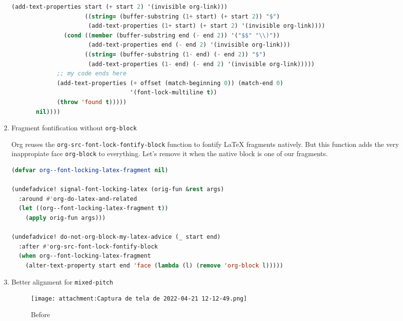 \documentclass[11pt]{article}
\begin{document}
\begin{enumerate}
\begin{enumerate}
\begin{lstlisting}[language=Lisp]
                      (add-text-properties start (+ start 2) '(invisible org-link)))
                     ((string= (buffer-substring (1+ start) (+ start 2)) "$")
                      (add-text-properties (1+ start) (+ start 2) '(invisible org-link))))
               (cond ((member (buffer-substring end (- end 2)) '("$$" "\\)"))
                      (add-text-properties end (- end 2) '(invisible org-link)))
                     ((string= (buffer-substring (1- end) (- end 2)) "$")
                      (add-text-properties (1- end) (- end 2) '(invisible org-link)))))
             ;; my code ends here
             (add-text-properties (+ offset (match-beginning 0)) (match-end 0)
                                  '(font-lock-multiline t))
             (throw 'found t)))))
       nil))))
\end{lstlisting}
  \item Fragment fontification without \texttt{org-block}
  \label{sec:fragment-fontification-without-org-block}

  Org reuses the \lstinline|org-src-font-lock-fontify-block| function to fontify LaTeX fragments natively. But this function adds the very inappropiate face \lstinline|org-block| to everything. Let’s remove it when the native block is one of our fragments.

\begin{lstlisting}[language=Lisp]
(defvar org--font-locking-latex-fragment nil)

(undefadvice! signal-font-locking-latex (orig-fun &rest args)
  :around #'org-do-latex-and-related
  (let ((org--font-locking-latex-fragment t))
    (apply orig-fun args)))

(undefadvice! do-not-org-block-my-latex-advice (_ start end)
  :after #'org-src-font-lock-fontify-block
  (when org--font-locking-latex-fragment
    (alter-text-property start end 'face (lambda (l) (remove 'org-block l)))))
\end{lstlisting}
  \item Better alignment for \texttt{mixed-pitch}
  \label{sec:better-alignment-for-mixed-pitch}

  \begin{row}

\begin{figure}
  
  \texttt{[image: attachment:Captura de tela de 2022-04-21 12-12-49.png]}
  \caption{Before}
\end{figure}



\end{row}
\end{enumerate}
\end{enumerate}
\end{document}
